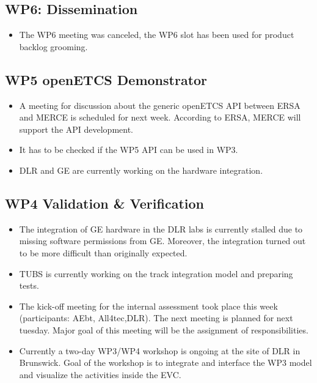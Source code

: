 \documentclass[a4paper, 11pt]{article}
\begin{document}
\subsection{WP6: Dissemination}
\begin{itemize}
\item The WP6 meeting was canceled, the WP6 slot has been used for product backlog grooming.
\end{itemize}

\subsection{WP5 openETCS Demonstrator}
\begin{itemize}
\item A meeting for discussion about the generic openETCS API between ERSA and MERCE is scheduled for next week. According to ERSA, MERCE will support the API development.
\item It has to be checked if the WP5 API can be used in WP3.
\item DLR and GE are currently working on the hardware integration.
\end{itemize}

\subsection{WP4 Validation \& Verification}
\begin{itemize}
\item The integration of GE hardware in the DLR labs is currently stalled due to missing software permissions from GE. Moreover, the integration turned out to be more difficult than originally expected.
\item TUBS is currently working on the track integration model and preparing tests.
\item The kick-off meeting for the internal assessment took place this week (participants: AEbt, All4tec,DLR). The next meeting is planned for next tuesday. Major goal of this meeting will be the assignment of responsibilities.
\item Currently a two-day WP3/WP4 workshop is ongoing at the site of DLR in Brunswick. Goal of the workshop is to integrate and interface the WP3 model and visualize the activities inside the EVC.
\end{itemize}
\end{document}
